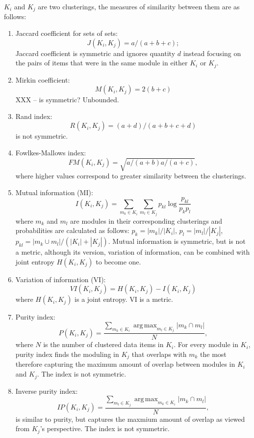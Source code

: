 \documentclass[12pt]{cmuthesis}
\DeclareMathOperator*{\argmax}{arg\,max}
\begin{document}
  $K_i$ and $K_j$ are two clusterings, the measures of similarity between them are as follows:
  \begin{enumerate}
    \item Jaccard coefficient for sets of sets:
    \[
    J(K_i, K_j) = a / (a + b + c);
    \]
    Jaccard coefficient is symmetric and ignores quantity $d$ instead focusing on the pairs of items that were in the same module in either $K_i$ or $K_j$.

    \item Mirkin coefficient:
    \[
    M(K_i, K_j) = 2(b + c)
    \]
    XXX -- is symmetric? Unbounded.

    \item Rand index:
    \[
    R(K_i, K_j) = (a + d) / (a + b + c + d)
    \]
    is not symmetric.

    \item Fowlkes-Mallows index:
    \[
    FM(K_i, K_j) = \sqrt{a / (a + b) a / (a + c) },
    \]
    where higher values correspond to greater similarity between the clusterings.

    \item Mutual information (MI):
    \[
    I(K_i,K_j) = \sum_{m_k \in K_i} \sum_{m_l \in K_j} p_{kl} 
        \log \frac{ p_{kl} }{ p_k p_l }
    \]
    where $m_k$ and $m_l$ are modules in their corresponding clusterings and probabilities are calculated as follows: $p_k = |m_k| / |K_i|$, $p_l = |m_l| / |K_j|$, $p_{kl} = |m_k \cup m_l| / (|K_i| + |K_j|)$. Mutual information is symmetric, but is not a metric, although its version, variation of information, can be combined with joint entropy $H(K_i, K_j)$ to become one.

    \item Variation of information (VI):
    \[
    VI(K_i,K_j) = H(K_i, K_j) - I(K_i, K_j)
    \]
    where $H(K_i, K_j)$ is a joint entropy. VI is a metric.

    \item Purity index:
    \[
    P(K_i,K_j) = \frac{ \sum_{m_k \in K_i} \argmax_{m_l \in K_j} |m_k \cap m_l| }{N},
    \]
    where $N$ is the number of clustered data items in $K_i$. For every module in $K_i$, purity index finds the moduling in $K_j$ that overlaps with $m_k$ the most therefore capturing the maximum amount of overlap between modules in $K_i$ and $K_j$. The index is not symmetric.

    \item Inverse purity index:
    \[
    IP(K_i,K_j) = \frac{ \sum_{m_l \in K_j} \argmax_{m_k \in K_i} |m_k \cap m_l| }{N},
    \]
    is similar to purity, but captures the maxmium amount of overlap as viewed from $K_j$'s perspective. The index is not symmetric.


\end{enumerate}
\end{document}
